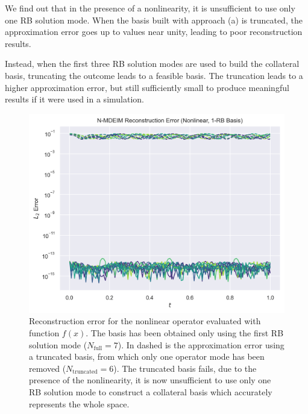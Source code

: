 \documentclass[../../thesis.tex]{subfiles}
\begin{document}
We find out that in the presence of a nonlinearity, 
it is unsufficient to use only one RB solution mode. 
When the basis built with approach (a) is truncated, the approximation error goes up 
to values near unity,
leading to poor reconstruction results.

Instead, when the first three RB solution modes are used to build the collateral basis,
truncating the outcome leads to a feasible basis.
The truncation leads to a higher approximation error, but still sufficiently small to produce
meaningful results if it were used in a simulation.    

\begin{figure}[h]
    \includegraphics[width=\columnwidth]{research_project/piston/figures/svd_fourier/trilinear_nonlinear/rb_basis_mdeim_errors_nonlinear_num_1.png}
    \caption{Reconstruction error for the nonlinear operator evaluated with function $f(x)$.
    The basis has been obtained only using the first RB solution mode ($N_{\text{full}}=7$).
    In dashed is the approximation error using a truncated basis, 
    from which only one operator mode has been removed ($N_{\text{truncated}}=6$). 
    The truncated basis fails, due to the presence of the nonlinearity, 
    it is now unsufficient to use only one RB solution mode 
    to construct a collateral basis which accurately represents the whole space.}
    \label{fig:appendix_rb_nonlinear_num_1}
\end{figure}
\end{document}
